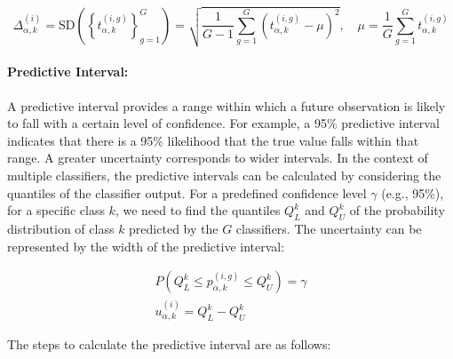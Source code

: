 \begin{equation}
    \Delta_{\alpha,k}^{(i)}=\text{SD}\left( {\left\{t_{\alpha,k}^{(i,g)}\right\}}_{g=1}^G\right)=\sqrt {\frac{1}{G-1} \sum_{g=1}^G {\left(t_{\alpha,k}^{(i,g)}-\mu\right)}^2},\quad\mu=\frac{1}{G}\sum_{g=1}^{G}{t_{\alpha,k}^{(i,g)}}
    \label{eq:crowd.eq.6.uncertainty.sd}
\end{equation}

\paragraph{Predictive Interval:}
A predictive interval provides a range within which a future observation is likely to fall with a certain level of confidence. For example, a 95\% predictive interval indicates that there is a 95\% likelihood that the true value falls within that range. A greater uncertainty corresponds to wider intervals. In the context of multiple classifiers, the predictive intervals can be calculated by considering the quantiles  of the classifier output. For a predefined confidence level $\gamma $ (e.g., 95\%), for a specific class $k $, we need to find the quantiles $Q_{L}^{k} $ and $Q_{U}^{k} $ of the probability distribution of class $k $ predicted by the $G $ classifiers. The uncertainty can be represented by the width of the predictive interval:

\begin{equation}
    \begin{aligned}
        P\left(Q_L^{k} \leq p_{\alpha,k}^{(i,g)} \leq Q_U^{k}\right) = \gamma
        \\
        u_{\alpha,k}^{(i)} = Q_L^{k} - Q_U^{k}
    \end{aligned}
    \label{eq:crowd.eq.uncertainty}
\end{equation}

The steps to calculate the predictive interval are as follows:

